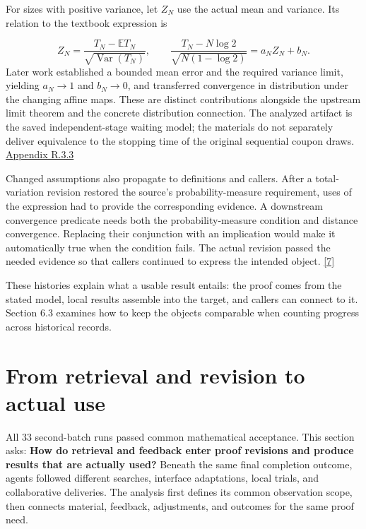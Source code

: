For sizes with positive variance, let $Z_N$ use the actual mean and variance. Its relation to the textbook expression is

\[
Z_N=\frac{T_N-\mathbb E T_N}{\sqrt{\operatorname{Var}(T_N)}},\qquad
\frac{T_N-N\log2}{\sqrt{N(1-\log2)}}=a_NZ_N+b_N.
\]
Later work established a bounded mean error and the required variance limit, yielding $a_N\to1$ and $b_N\to0$, and transferred convergence in distribution under the changing affine maps. These are distinct contributions alongside the upstream limit theorem and the concrete distribution connection. The analyzed artifact is the saved independent-stage waiting model; the materials do not separately deliver equivalence to the stopping time of the original sequential coupon draws. \href{en-appendix.pdf\#r3-3}{Appendix R.3.3}

Changed assumptions also propagate to definitions and callers. After a total-variation revision restored the source's probability-measure requirement, uses of the expression had to provide the corresponding evidence. A downstream convergence predicate needs both the probability-measure condition and distance convergence. Replacing their conjunction with an implication would make it automatically true when the condition fails. The actual revision passed the needed evidence so that callers continued to express the intended object. \hyperlink{ref-7}{\mbox{[7]}}

These histories explain what a usable result entails: the proof comes from the stated model, local results assemble into the target, and callers can connect to it. Section 6.3 examines how to keep the objects comparable when counting progress across historical records.

\section[From retrieval and revision to actual use]{\texorpdfstring{\protect\hypertarget{section-5}{}From retrieval and revision to actual use}{From retrieval and revision to actual use}}
All 33 second-batch runs passed common mathematical acceptance. This section asks: \textbf{How do retrieval and feedback enter proof revisions and produce results that are actually used?} Beneath the same final completion outcome, agents followed different searches, interface adaptations, local trials, and collaborative deliveries. The analysis first defines its common observation scope, then connects material, feedback, adjustments, and outcomes for the same proof need.

